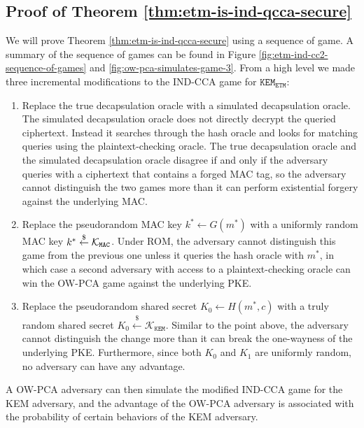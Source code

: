 \documentclass[letterpaper,12pt,titlepage,oneside,final]{book}
\newcommand{\kem}{\texttt{KEM}}
\newcommand{\etm}{{\texttt{ETM}}}  %
\newcommand{\mac}{\texttt{\texttt{MAC}}}
\newcommand{\leftsample}{\stackrel{\$}{\leftarrow}}
\begin{document}
\subsection{Proof of Theorem \ref{thm:etm-is-ind-qcca-secure}}\label{sec:proof-of-etm-theorem}
We will prove Theorem \ref{thm:etm-is-ind-qcca-secure} using a sequence of game. A summary of the sequence of games can be found in Figure \ref{fig:etm-ind-cc2-sequence-of-games} and \ref{fig:ow-pca-simulates-game-3}. From a high level we made three incremental modifications to the IND-CCA game for $\kem_\etm$: \begin{enumerate}
    \item Replace the true decapsulation oracle with a simulated decapsulation oracle. The simulated decapsulation oracle does not directly decrypt the queried ciphertext. Instead it searches through the hash oracle and looks for matching queries using the plaintext-checking oracle. The true decapsulation oracle and the simulated decapsulation oracle disagree if and only if the adversary queries with a ciphertext that contains a forged MAC tag, so the adversary cannot distinguish the two games more than it can perform existential forgery against the underlying MAC.
    \item Replace the pseudorandom MAC key $k^\ast \leftarrow G(m^\ast)$ with a uniformly random MAC key $k^\ast \leftsample \mathcal{K}_\mac$. Under ROM, the adversary cannot distinguish this game from the previous one unless it queries the hash oracle with $m^\ast$, in which case a second adversary with access to a plaintext-checking oracle can win the OW-PCA game against the underlying PKE.
    \item Replace the pseudorandom shared secret $K_0 \leftarrow H(m^\ast, c)$ with a truly random shared secret $K_0 \leftsample \mathcal{K}_\kem$. Similar to the point above, the adversary cannot distinguish the change more than it can break the one-wayness of the underlying PKE. Furthermore, since both $K_0$ and $K_1$ are uniformly random, no adversary can have any advantage.
\end{enumerate}

A OW-PCA adversary can then simulate the modified IND-CCA game for the KEM adversary, and the advantage of the OW-PCA adversary is associated with the probability of certain behaviors of the KEM adversary.
\end{document}
